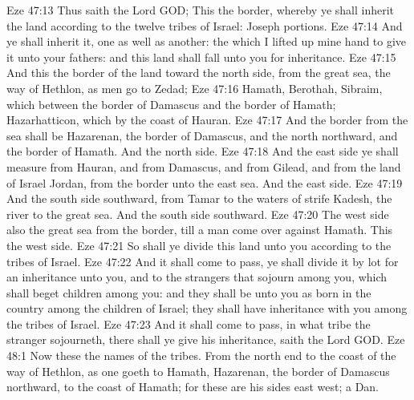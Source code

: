 \vs Eze 47:13 Thus saith the Lord GOD; This  the border, whereby ye shall inherit the land according to the twelve tribes of Israel: Joseph  portions.
\vs Eze 47:14 And ye shall inherit it, one as well as another:  the which I lifted up mine hand to give it unto your fathers: and this land shall fall unto you for inheritance.
\vs Eze 47:15 And this  the border of the land toward the north side, from the great sea, the way of Hethlon, as men go to Zedad;
\vs Eze 47:16 Hamath, Berothah, Sibraim, which  between the border of Damascus and the border of Hamath; Hazarhatticon, which  by the coast of Hauran.
\vs Eze 47:17 And the border from the sea shall be Hazarenan, the border of Damascus, and the north northward, and the border of Hamath. And  the north side.
\vs Eze 47:18 And the east side ye shall measure from Hauran, and from Damascus, and from Gilead, and from the land of Israel  Jordan, from the border unto the east sea. And  the east side.
\vs Eze 47:19 And the south side southward, from Tamar  to the waters of strife  Kadesh, the river to the great sea. And  the south side southward.
\vs Eze 47:20 The west side also  the great sea from the border, till a man come over against Hamath. This  the west side.
\vs Eze 47:21 So shall ye divide this land unto you according to the tribes of Israel.
\vs Eze 47:22 And it shall come to pass,  ye shall divide it by lot for an inheritance unto you, and to the strangers that sojourn among you, which shall beget children among you: and they shall be unto you as born in the country among the children of Israel; they shall have inheritance with you among the tribes of Israel.
\vs Eze 47:23 And it shall come to pass,  in what tribe the stranger sojourneth, there shall ye give  his inheritance, saith the Lord GOD.
\vs Eze 48:1 Now these  the names of the tribes. From the north end to the coast of the way of Hethlon, as one goeth to Hamath, Hazarenan, the border of Damascus northward, to the coast of Hamath; for these are his sides east  west; a  Dan.
